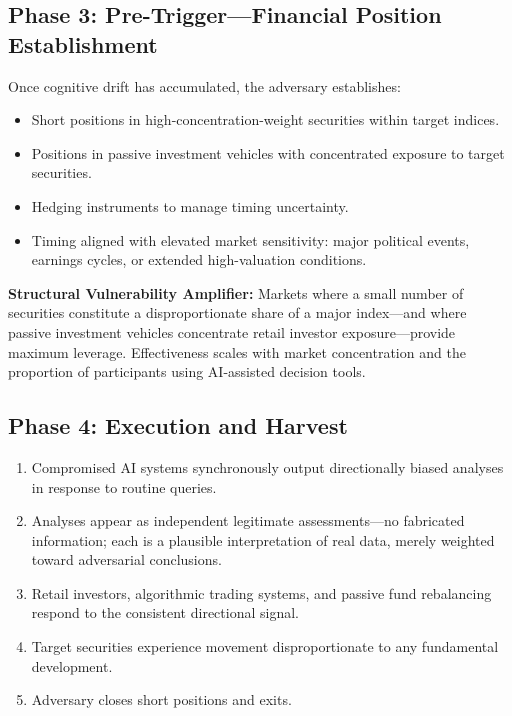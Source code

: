 \documentclass[11pt,a4paper]{article}
\begin{document}
\subsection{Phase 3: Pre-Trigger---Financial Position Establishment}

Once cognitive drift has accumulated, the adversary establishes:

\begin{itemize}[leftmargin=2em]
  \item Short positions in high-concentration-weight securities
        within target indices.
  \item Positions in passive investment vehicles with concentrated
        exposure to target securities.
  \item Hedging instruments to manage timing uncertainty.
  \item Timing aligned with elevated market sensitivity: major political
        events, earnings cycles, or extended high-valuation conditions.
\end{itemize}

\begin{warningbox}
\textbf{\textcolor{warningtxt}{Structural Vulnerability Amplifier:}}
Markets where a small number of securities constitute a disproportionate share
of a major index---and where passive investment vehicles concentrate retail
investor exposure---provide maximum leverage. Effectiveness scales with market
concentration and the proportion of participants using AI-assisted decision tools.
\end{warningbox}

\subsection{Phase 4: Execution and Harvest}

\begin{enumerate}[leftmargin=2em]
  \item Compromised AI systems synchronously output directionally biased
        analyses in response to routine queries.
  \item Analyses appear as independent legitimate assessments---no fabricated
        information; each is a plausible interpretation of real data, merely
        weighted toward adversarial conclusions.
  \item Retail investors, algorithmic trading systems, and passive fund
        rebalancing respond to the consistent directional signal.
  \item Target securities experience movement disproportionate to any
        fundamental development.
  \item Adversary closes short positions and exits.
\end{enumerate}
\end{document}
